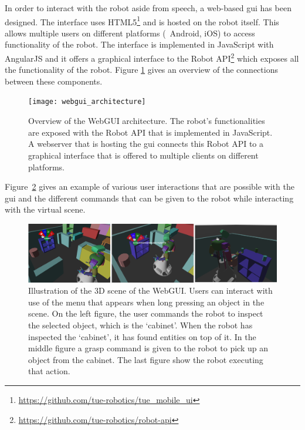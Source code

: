 In order to interact with the robot aside from speech, a web-based \gls{gui} has been designed.
The interface uses
HTML5\footnote{\url{https://github.com/tue-robotics/tue_mobile_ui}} and is hosted on the robot itself.
This allows multiple users on different platforms (\eg\ Android, iOS) to access functionality of the robot. The interface is implemented in JavaScript with AngularJS and it offers a graphical interface to the Robot API\footnote{\url{https://github.com/tue-robotics/robot-api}} which exposes all the functionality of the robot.
Figure \ref{fig:webgui_architecture} gives an overview of the connections between these components.
\begin{figure}[h]
    \centering
	\texttt{[image: webgui\_architecture]}
	\caption{
		Overview of the WebGUI architecture.
		The robot's functionalities are exposed with the Robot API that is implemented in JavaScript.
		A webserver that is hosting the \protect\gls{gui} connects this Robot API to a graphical interface that is offered to multiple clients on different platforms.}
	\label{fig:webgui_architecture}
\end{figure}
Figure~\ref{fig:gui_actions} gives an example of various user interactions that are possible with the \gls{gui} and the different commands that can be given to the robot while interacting with the virtual scene.

\begin{figure}[H]
	\includegraphics[width=\linewidth]{Figures/gui_actions}
	\caption{
		Illustration of the 3D scene of the WebGUI.
		Users can interact with use of the menu that appears when long pressing an object in the scene.
		On the left figure, the user commands the robot to inspect the selected object, which is the `cabinet'.
		When the robot has inspected the `cabinet', it has found entities on top of it.
		In the middle figure a grasp command is given to the robot to pick up an object from the cabinet.
		The last figure show the robot executing that action.}
	\label{fig:gui_actions}
\end{figure}
